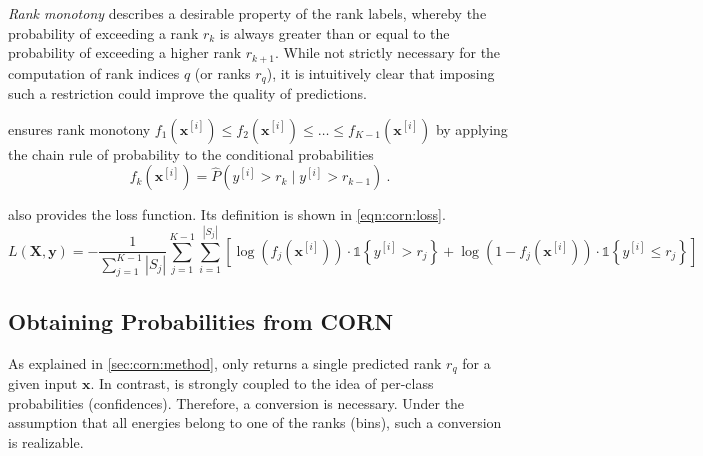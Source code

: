 \emph{Rank monotony} describes a desirable property of the rank labels,
whereby the probability of exceeding a rank $r_k$ is always greater than or equal to the probability of exceeding a higher rank $r_{k+1}$.
%
While not strictly necessary for the computation of rank indices $q$ (or ranks $r_q$),
it is intuitively clear that imposing such a restriction could improve the quality of predictions.

\corn{} ensures rank monotony
  $f_1(\mathbf{x}^{[i]}) \leq f_2(\mathbf{x}^{[i]}) \leq \ldots \leq f_{K-1}(\mathbf{x}^{[i]})$
by applying the chain rule of probability
to the conditional probabilities
\begin{equation}
  f_k(\mathbf{x}^{[i]}) = \hat{P}\left( y^{[i]} > r_k \mid y^{[i]} > r_{k-1} \right) \ .
\end{equation}




\corn{} also provides the loss function.
Its definition is shown in \autoref{eqn:corn:loss}.
\begin{equation}
  \label{eqn:corn:loss}
  L(\mathbf{X}, \mathbf{y}) =
  - \frac{1}{\sum_{j=1}^{K-1} |S_j|}
  \sum_{j=1}^{K-1}
  \sum_{i=1}^{|S_j|}
  \left[
    \log(f_j(\mathbf{x}^{[i]})) · \mathbb{1}\left\{y^{[i]} > r_j\right\}
    +
    \log(1 - f_j(\mathbf{x}^{[i]})) · \mathbb{1}\left\{y^{[i]} \leq r_j\right\}
  \right]
\end{equation}


\subsection{Obtaining Probabilities from CORN} \label{sec:ordinal:corn:probas}
As explained in \autoref{sec:corn:method},
\corn{} only returns a single predicted rank $r_q$ for a given input $\mathbf{x}$.
In contrast,
\dsea{} is strongly coupled to the idea of per-class probabilities (confidences).
Therefore, a conversion is necessary.
Under the assumption that all energies belong to one of the ranks (bins),
such a conversion is realizable.

